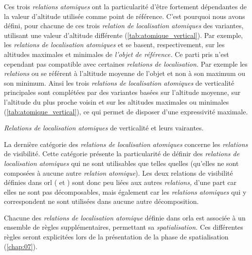 Ces trois \emph{relations atomiques} ont la particularité d'être
fortement dépendantes de la valeur d'altitude utilisée comme point de
référence. C'est pourquoi nous avons défini, pour chacune de ces trois
\emph{relation de localisation atomiques} des variantes, utilisant une
valeur d'altitude différente (\autoref{tab:atomique_vertical}). Par
exemple, les \emph{relations de localisation atomiques}
 et
 se
basent, respectivement, sur les altitudes maximales et minimales de
\emph{l'objet de référence.} Ce parti pris n'est cependant pas
compatible avec certaines \emph{relations de localisation.} Par
exemple les \emph{relations}
 ou
 se référent à l'altitude
moyenne de l'objet et non à son maximum ou son minimum. Ainsi les
trois \emph{relations de localisation atomiques} de verticalité
principales sont complétées par des variantes basées sur l'altitude
moyenne, sur l'altitude du plus proche voisin et sur les altitudes
maximales ou minimales (\autoref{tab:atomique_vertical}), ce qui
permet de disposer d'une expressivité maximale.

\begin{table}
  \centering
  
  \caption{\emph{Relations de localisation atomiques} de verticalité
    et leurs vairantes.}
  \label{tab:atomique_vertical}
\end{table}

La dernière catégorie des \emph{relations de localisation atomiques}
concerne les \emph{relations} de visibilité. Cette catégorie présente
la particularité de définir des \emph{relations de localisation
  atomiques} qui ne sont utilisables que telles quelles (\ie qu'elles
ne sont composées à aucune autre \emph{relation atomique}). Les deux
relations de visibilité définies dans \ac{orl} (\ie
{} et
) sont donc peu liées aux autres
\emph{relations,} d'une part car elles ne sont pas décomposables, mais
également car les \emph{relations atomiques} qui y correspondent ne
sont utilisées dans aucune autre décomposition.

Chacune des \emph{relations de localisation atomique} définie dans
\ac{orla} est associée à un ensemble de règles supplémentaires,
permettant sa \emph{spatialisation.} Ces différentes règles seront
explicitées lors de la présentation de la phase de spatialisation
(\autoref{chap:07}).


